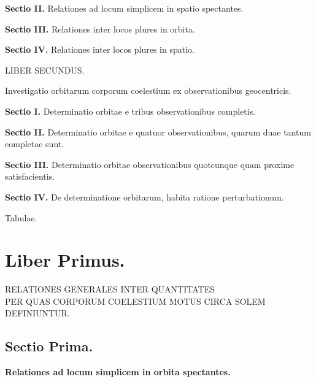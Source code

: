 \documentclass[12pt,a4paper]{book}
\begin{document}
\medskip
\noindent\textbf{Sectio II.} Relationes ad locum simplicem in spatio spectantes.

\medskip
\noindent\textbf{Sectio III.} Relationes inter locos plures in orbita.

\medskip
\noindent\textbf{Sectio IV.} Relationes inter locos plures in spatio.

\bigskip
\begin{center}
{\Large LIBER SECUNDUS.}
\end{center}
\begin{center}
Investigatio orbitarum corporum coelestium ex observationibus geocentricis.
\end{center}

\noindent\textbf{Sectio I.} Determinatio orbitae e tribus observationibus completis.

\medskip
\noindent\textbf{Sectio II.} Determinatio orbitae e quatuor observationibus, quarum duae tantum completae sunt.

\medskip
\noindent\textbf{Sectio III.} Determinatio orbitae observationibus quotcunque quam proxime satisfacientis.

\medskip
\noindent\textbf{Sectio IV.} De determinatione orbitarum, habita ratione perturbationum.

\medskip
\noindent Tabulae.

\newpage
\chapter*{Liber Primus.}

\begin{center}
{\Large RELATIONES GENERALES INTER QUANTITATES}\\[0.3cm]
{\Large PER QUAS CORPORUM COELESTIUM MOTUS CIRCA SOLEM}\\[0.3cm]
{\Large DEFINIUNTUR.}
\end{center}

\section*{Sectio Prima.}
\begin{center}
\textbf{Relationes ad locum simplicem in orbita spectantes.}
\end{center}
\end{document}
